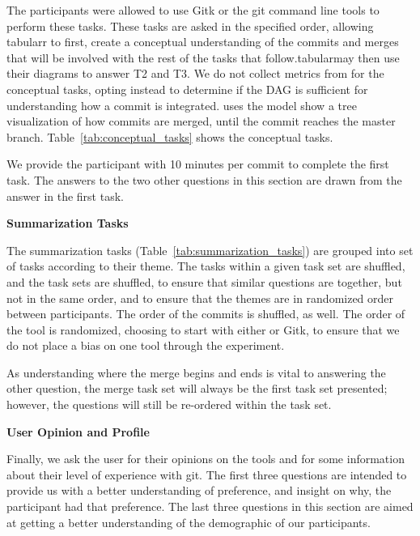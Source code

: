 \documentclass[draft]{IEEEtran}
\begin{document}
The participants were allowed to use Gitk or the git command line tools
to perform these tasks. These tasks are asked in the specified order,
allowing tabularr to first, create a conceptual understanding of the
commits and merges that will be involved with the rest of the tasks that
follow.tabularmay then use their diagrams to answer T2 and T3. We do not
collect metrics from \tool for the conceptual tasks, opting instead to
determine if the DAG is sufficient for understanding how a commit is
integrated. \tool uses the \mt model show a tree visualization of how
commits are merged, until the commit reaches the master branch.
Table~\ref{tab:conceptual_tasks} shows the conceptual tasks.


We provide the participant with 10 minutes per commit to complete the
first task. The answers to the two other questions in this section are
drawn from the answer in the first task.

\textbf{Summarization Tasks}



The summarization tasks (Table~\ref{tab:summarization_tasks}) are
grouped into  set of tasks according to their theme. The
tasks within a given task set are shuffled, and the task sets are
shuffled, to ensure that similar questions are together, but not in the
same order, and to ensure that the themes are in randomized order
between participants. The order of the commits is shuffled, as well. The
order of the tool is randomized, choosing to start with either \tool or
Gitk, to ensure that we do not place a bias on one tool through the
experiment.

As understanding where the merge begins and ends is vital to answering
the other question, the merge task set will always be the first task set
presented; however, the questions will still be re-ordered within the
task set.

\textbf{User Opinion and Profile}

Finally, we ask the user for their opinions on the tools and for some
information about their level of experience with git.   The first three questions are intended
to provide us with a better understanding of preference, and insight on
why, the participant had that preference.  The last three questions in
this section are aimed at getting a better understanding of the
demographic of our participants.
\end{document}

